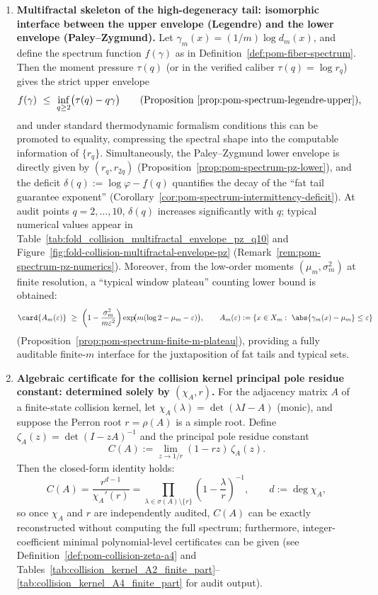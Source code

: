 \begin{enumerate}
  \item \textbf{Multifractal skeleton of the high-degeneracy tail: isomorphic interface between the upper envelope (Legendre) and the lower envelope (Paley--Zygmund).}
  Let \(\gamma_m(x)=(1/m)\log d_m(x)\), and define the spectrum function \(f(\gamma)\) as in Definition~\ref{def:pom-fiber-spectrum}.
  Then the moment pressure \(\tau(q)\) (or in the verified caliber \(\tau(q)=\log r_q\)) gives the strict upper envelope
  \[
  f(\gamma)\ \le\ \inf_{q\ge 2}\bigl(\tau(q)-q\gamma\bigr)
  \qquad\text{(Proposition~\ref{prop:pom-spectrum-legendre-upper})},
  \]
  and under standard thermodynamic formalism conditions this can be promoted to equality, compressing the spectral shape into the computable information of \(\{r_q\}\).
  Simultaneously, the Paley--Zygmund lower envelope is directly given by \((r_q,r_{2q})\) (Proposition~\ref{prop:pom-spectrum-pz-lower}), and the deficit
  \(
  \delta(q):=\log\varphi-\underline f(q)
  \)
  quantifies the decay of the ``fat tail guarantee exponent'' (Corollary~\ref{cor:pom-spectrum-intermittency-deficit}).
  At audit points \(q=2,\dots,10\), \(\delta(q)\) increases significantly with \(q\); typical numerical values appear in Table~\ref{tab:fold_collision_multifractal_envelope_pz_q10} and Figure~\ref{fig:fold-collision-multifractal-envelope-pz} (Remark~\ref{rem:pom-spectrum-pz-numerics}).
  Moreover, from the low-order moments \((\mu_m,\sigma_m^2)\) at finite resolution, a ``typical window plateau'' counting lower bound is obtained:
  \[
  \card{A_m(\varepsilon)}
  \ \ge\
  \left(1-\frac{\sigma_m^2}{m\varepsilon^2}\right)
  \exp\!\bigl(m(\log 2-\mu_m-\varepsilon)\bigr),
  \qquad
  A_m(\varepsilon):=\{x\in X_m:\ \abs{\gamma_m(x)-\mu_m}\le \varepsilon\}
  \]
  (Proposition~\ref{prop:pom-spectrum-finite-m-plateau}), providing a fully auditable finite-\(m\) interface for the juxtaposition of fat tails and typical sets.

  \item \textbf{Algebraic certificate for the collision kernel principal pole residue constant: determined solely by \texorpdfstring{$(\chi_A,r)$}{(chiA,r)}.}
  For the adjacency matrix \(A\) of a finite-state collision kernel, let \(\chi_A(\lambda)=\det(\lambda I-A)\) (monic), and suppose the Perron root \(r=\rho(A)\) is a simple root.
  Define
  \(
  \zeta_A(z)=\det(I-zA)^{-1}
  \)
  and the principal pole residue constant
  \[
  C(A):=\lim_{z\to 1/r}(1-rz)\,\zeta_A(z).
  \]
  Then the closed-form identity holds:
  \[
  C(A)=\frac{r^{d-1}}{\chi_A'(r)}
  =\prod_{\lambda\in\sigma(A)\setminus\{r\}}\left(1-\frac{\lambda}{r}\right)^{-1},
  \qquad d:=\deg\chi_A,
  \]
  so once \(\chi_A\) and \(r\) are independently audited, \(C(A)\) can be exactly reconstructed without computing the full spectrum; furthermore, integer-coefficient minimal polynomial-level certificates can be given (see Definition~\ref{def:pom-collision-zeta-a4} and Tables~\ref{tab:collision_kernel_A2_finite_part}--\ref{tab:collision_kernel_A4_finite_part} for audit output).


\end{enumerate}
